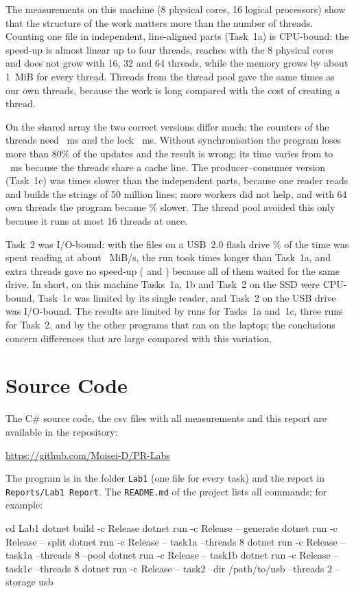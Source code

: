 \documentclass[12pt,a4paper]{article}
\begin{document}
The measurements on this machine (8 physical cores, 16 logical processors) show that the structure of the work matters more than the number of threads. Counting one file in independent, line-aligned parts (Task~1a) is CPU-bound: the speed-up is almost linear up to four threads, reaches \aSpeedEight{} with the 8 physical cores and does not grow with 16, 32 and 64 threads, while the memory grows by about 1~MiB for every thread. Threads from the thread pool gave the same times as our own threads, because the work is long compared with the cost of creating a thread.

On the shared array the two correct versions differ much: the counters of the threads need \bPerThreadMs{}~ms and the lock \bLockMs{}~ms. Without synchronisation the program loses more than 80\% of the updates and the result is wrong; its time varies from \bNoSyncMsMin{} to \bNoSyncMsMax{}~ms because the threads share a cache line. The producer--consumer version (Task~1c) was \cOverABest{} times slower than the independent parts, because one reader reads and builds the strings of 50 million lines; more workers did not help, and with 64 own threads the program became \cSlowdownSixtyFour\% slower. The thread pool avoided this only because it runs at most 16 threads at once.

Task~2 was I/O-bound: with the files on a USB~2.0 flash drive \tUsbReadShare\% of the time was spent reading at about \tUsbMiBs{}~MiB/s, the run took \tUsbOverA{} times longer than Task~1a, and extra threads gave no speed-up (\tUsbSpeedTwo{} and \tUsbSpeedFour) because all of them waited for the same drive. In short, on this machine Tasks~1a, 1b and Task~2 on the SSD were CPU-bound, Task~1c was limited by its single reader, and Task~2 on the USB drive was I/O-bound. The results are limited by \aRunsEach{} runs for Tasks~1a and~1c, three runs for Task~2, and by the other programs that ran on the laptop; the conclusions concern differences that are large compared with this variation.

\section{Source Code}

The C\# source code, the csv files with all measurements and this report are available in the repository:

\begin{center}
  \url{https://github.com/Moisei-D/PR-Labs}
\end{center}

The program is in the folder \texttt{Lab1} (one file for every task) and the report in \texttt{Reports/Lab1 Report}. The \texttt{README.md} of the project lists all commands; for example:

\begin{terminaloutput}
cd Lab1
dotnet build -c Release
dotnet run -c Release -- generate
dotnet run -c Release -- split
dotnet run -c Release -- task1a --threads 8
dotnet run -c Release -- task1a --threads 8 --pool
dotnet run -c Release -- task1b
dotnet run -c Release -- task1c --threads 8
dotnet run -c Release -- task2 --dir /path/to/usb --threads 2 --storage usb
\end{terminaloutput}
\end{document}

